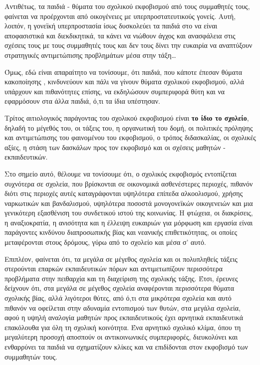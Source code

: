 \documentclass[12pt,a4paper,oneside]{book}
\begin{document}
\indent Αντιθέτως, τα παιδιά -
θύματα του σχολικού εκφοβισμού από τους συμμαθητές τους, φαίνεται να προέρχονται από
οικογένειες με υπερπροστατευτικούς γονείς. Αυτή, λοιπόν, η γονεϊκή υπερπροστασία
ίσως δυσκολεύει τα παιδιά στο να είναι αποφασιστικά και διεκδικητικά, τα κάνει
να νιώθουν άγχος και ανασφάλεια στις σχέσεις τους με τους συμμαθητές τους και
δεν τους δίνει την ευκαιρία να αναπτύξουν στρατηγικές αντιμετώπισης προβλημάτων
μέσα στην τάξη\ldots

\indent Όμως, εδώ είναι απαραίτητο να τονίσουμε, ότι παιδιά, που κάποτε έπεσαν
θύματα κακοποίησης , κινδυνεύουν και πάλι να γίνουν θύματα σχολικού εκφοβισμού, αλλά υπάρχουν και πιθανότητες επίσης,
να εκδηλώσουν συμπεριφορά θύτη και να εφαρμόσουν στα άλλα παιδιά, ό,τι τα ίδια
υπέστησαν.

\indent Τρίτος αιτιολογικός παράγοντας του σχολικού εκφοβισμού είναι \textbf{το
ίδιο το σχολείο}, δηλαδή το μέγεθός του, οι τάξεις του, η οργανωτική του δομή, οι πολιτικές πρόληψης και αντιμετώπισης του
φαινομένου του εκφοβισμού, ο τρόπος διδασκαλίας, οι σχολικές αξίες, η στάση των
δασκάλων προς τον εκφοβισμό και οι σχέσεις μαθητών - εκπαιδευτικών.

\indent Στο σημείο αυτό, θέλουμε να
τονίσουμε ότι, ο σχολικός εκφοβισμός εντοπίζεται συχνότερα σε σχολεία, που
βρίσκονται σε οικονομικά ασθενέστερες περιοχές, πιθανόν διότι στις περιοχές
αυτές καταγράφονται υψηλότερα επίπεδα αλκοολισμού, χρήσης ναρκωτικών και
βανδαλισμού, υψηλότερα ποσοστά μονογονεϊκών οικογενειών και μια  γενικότερη
εξασθένιση του συνδετικού ιστού της κοινωνίας. Η φτώχεια, οι διακρίσεις, η
αναξιοκρατία, η ανισότητα και η έλλειψη ευκαιριών για μόρφωση και εργασία είναι
παράγοντες κινδύνου διαπροσωπικής βίας και νεανικής επιθετικότητας, οι οποίες
μεταφέρονται στους δρόμους, γύρω από το σχολείο και μέσα σ' αυτό.

\indent Επιπλέον, φαίνεται ότι, τα
μεγάλα σε μέγεθος σχολεία και οι πολυπληθείς τάξεις στερούνται επαρκών εκπαιδευτικών πόρων
και αντιμετωπίζουν περισσότερα προβλήματα στην πειθαρχία και τη διαχείριση της
σχολικής τάξης. Έτσι, έρευνες δείχνουν ότι, στα μεγάλα σε μέγεθος σχολεία
αναφέρονται περισσότερα θύματα σχολικής βίας, αλλά λιγότεροι θύτες, από ό,τι στα
μικρότερα σχολεία και αυτό πιθανόν να οφείλεται στην αδυναμία εντοπισμού των
θυτών, στα μεγάλα σχολεία, αφού η υψηλή αναλογία μαθητών προς εκπαιδευτικούς
έχει αρνητικά εκπαιδευτικά επακόλουθα για όλη τη σχολική κοινότητα. Ένα
αρνητικό σχολικό κλίμα, όπου τη μεγαλύτερη προσοχή αποσπούν οι αντικοινωνικές
συμπεριφορές, διευκολύνει και ενθαρρύνει τα παιδιά να σχηματίζουν κλίκες και να
επιδίδονται στον εκφοβισμό των συμμαθητών τους.
\end{document}
